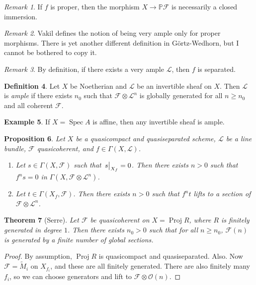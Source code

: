 \documentclass[leqno, openany]{memoir}
\newtheorem{thm}{Theorem}[section]
\newtheorem{prop}[thm]{Proposition}
\theoremstyle{definition}
\newtheorem{defn}[thm]{Definition}
\newtheorem{exm}[thm]{Example}
\theoremstyle{remark}
\newtheorem{rmk}[thm]{Remark}
\theoremstyle{plain}
\theoremstyle{definition}
\theoremstyle{remark}
\renewcommand{\P}{\mathbb{P}}
\newcommand{\mc}[1]{\mathcal{#1}}
\newcommand{\wt}[1]{\widetilde{#1}}
\DeclareMathOperator{\Spec}{Spec}
\DeclareMathOperator{\Proj}{Proj}
\begin{document}
\begin{rmk} If $f$ is proper, then the morphism $X \to \P \mc{F}$ is
necessarily a closed immersion.  \end{rmk}

\begin{rmk} Vakil defines the notion of being very ample only for proper
morphisms. There is yet another different definition in G\"ortz-Wedhorn, but I
cannot be bothered to copy it.  \end{rmk}

\begin{rmk} By definition, if there exists a very ample $\mc{L}$, then $f$ is
separated.  \end{rmk}

\begin{defn} Let $X$ be Noetherian and $\mc{L}$ be an invertible sheaf on $X$.
    Then $\mc{L}$ is \textit{ample} if there exists $n_0$ such that $\mc{F}
    \otimes \mc{L}^n$ is globally generated for all $n \geq n_0$ and all
    coherent $\mc{F}$.  \end{defn}

\begin{exm} If $X = \Spec A$ is affine, then any invertible sheaf is ample.
\end{exm}

\begin{prop} Let $X$ be a quasicompact and quasiseparated scheme, $\mc{L}$ be a
    line bundle, $\mc{F}$ quasicoherent, and $f \in \Gamma(X, \mc{L})$.
    \begin{enumerate} \item Let $s \in \Gamma(X, \mc{F})$ such that
        $\eval{s}_{X_f} = 0$. Then there exists $n > 0$ such that $f^n s = 0$
        in $\Gamma(X, \mc{F} \otimes \mc{L}^n)$.  \item Let $t \in \Gamma(X_f,
\mc{F})$. Then there exists $n > 0$ such that $f^n t$ lifts to a section of
$\mc{F} \otimes \mc{L}^n$.  \end{enumerate} \end{prop}

\begin{thm}[Serre] Let $\mc{F}$ be quasicoherent on $X = \Proj R$, where $R$ is
    finitely generated in degree $1$. Then there exists $n_0 > 0$ such that for
    all $n \geq n_0$, $\mc{F}(n)$ is generated by a finite number of global
    sections.  \end{thm}

\begin{proof} By assumption, $\Proj R$ is quasicompact and quasiseparated.
    Also. Now $\mc{F} = \wt{M}_i$ on $X_{f_i}$, and these are all finitely
    generated. There are also finitely many $f_i$, so we can choose generators
    and lift to $\mc{F} \otimes \mc{O}(n)$.  \end{proof}
\end{document}
